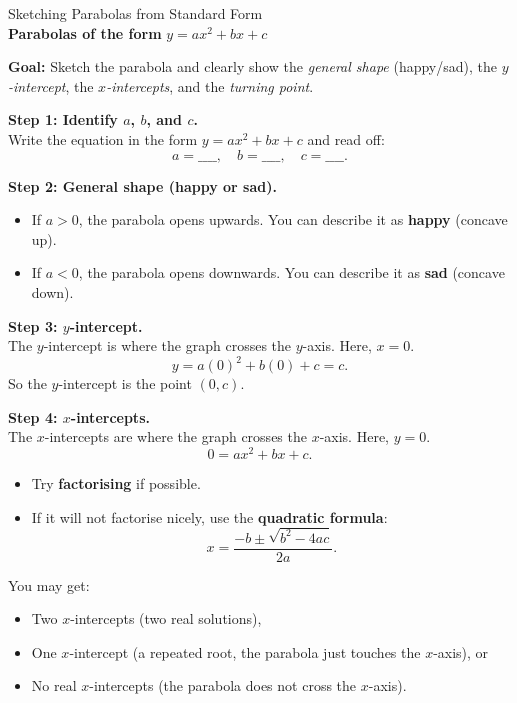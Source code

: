 \documentclass[12pt,a4paper]{article}
\begin{document}
\begin{center}
  {\LARGE Sketching Parabolas from Standard Form}\\[0.5cm]
  \textbf{Parabolas of the form} \quad $y = ax^2 + bx + c$
\end{center}

\textbf{Goal:} Sketch the parabola and clearly show the \emph{general shape} (happy/sad), the \emph{$y$-intercept}, the \emph{$x$-intercepts}, and the \emph{turning point}.

\vspace{0.3cm}

\textbf{Step 1: Identify $a$, $b$, and $c$.}\\[0.3ex]
Write the equation in the form $y = ax^2 + bx + c$ and read off:
\[
a = \_\_\_\_, \quad b = \_\_\_\_, \quad c = \_\_\_\_.
\]

\textbf{Step 2: General shape (happy or sad).}\\[0.3ex]
\begin{itemize}
  \item If $a > 0$, the parabola opens upwards. You can describe it as \textbf{happy} (concave up).
  \item If $a < 0$, the parabola opens downwards. You can describe it as \textbf{sad} (concave down).
\end{itemize}

\textbf{Step 3: $y$-intercept.}\\[0.3ex]
The $y$-intercept is where the graph crosses the $y$-axis. Here, $x = 0$.
\[
y = a(0)^2 + b(0) + c = c.
\]
So the $y$-intercept is the point $(0,c)$.

\textbf{Step 4: $x$-intercepts.}\\[0.3ex]
The $x$-intercepts are where the graph crosses the $x$-axis. Here, $y = 0$.
\[
0 = ax^2 + bx + c.
\]
\begin{itemize}
  \item Try \textbf{factorising} if possible.
  \item If it will not factorise nicely, use the \textbf{quadratic formula}:
  \[
  x = \frac{-b \pm \sqrt{b^2 - 4ac}}{2a}.
  \]
\end{itemize}
You may get:
\begin{itemize}
  \item Two $x$-intercepts (two real solutions),
  \item One $x$-intercept (a repeated root, the parabola just touches the $x$-axis), or
  \item No real $x$-intercepts (the parabola does not cross the $x$-axis).
\end{itemize}
\end{document}
